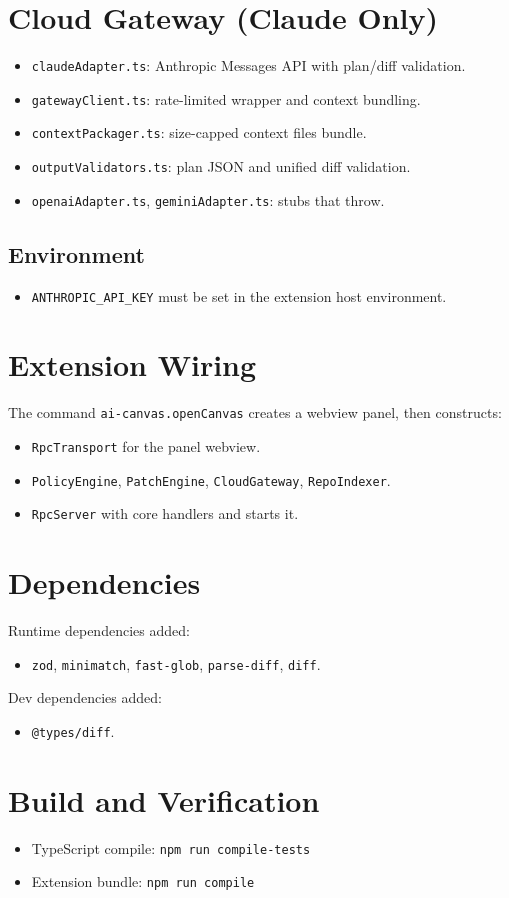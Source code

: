 \documentclass[11pt]{article}
\begin{document}
\section{Cloud Gateway (Claude Only)}
\begin{itemize}[noitemsep]
  \item \texttt{claudeAdapter.ts}: Anthropic Messages API with plan/diff validation.
  \item \texttt{gatewayClient.ts}: rate-limited wrapper and context bundling.
  \item \texttt{contextPackager.ts}: size-capped context files bundle.
  \item \texttt{outputValidators.ts}: plan JSON and unified diff validation.
  \item \texttt{openaiAdapter.ts}, \texttt{geminiAdapter.ts}: stubs that throw.
\end{itemize}

\subsection{Environment}
\begin{itemize}[noitemsep]
  \item \texttt{ANTHROPIC\_API\_KEY} must be set in the extension host environment.
\end{itemize}

\section{Extension Wiring}
The command \texttt{ai-canvas.openCanvas} creates a webview panel, then constructs:
\begin{itemize}[noitemsep]
  \item \texttt{RpcTransport} for the panel webview.
  \item \texttt{PolicyEngine}, \texttt{PatchEngine}, \texttt{CloudGateway}, \texttt{RepoIndexer}.
  \item \texttt{RpcServer} with core handlers and starts it.
\end{itemize}

\section{Dependencies}
Runtime dependencies added:
\begin{itemize}[noitemsep]
  \item \texttt{zod}, \texttt{minimatch}, \texttt{fast-glob}, \texttt{parse-diff}, \texttt{diff}.
\end{itemize}

Dev dependencies added:
\begin{itemize}[noitemsep]
  \item \texttt{@types/diff}.
\end{itemize}

\section{Build and Verification}
\begin{itemize}[noitemsep]
  \item TypeScript compile: \texttt{npm run compile-tests}
  \item Extension bundle: \texttt{npm run compile}
\end{itemize}
\end{document}
